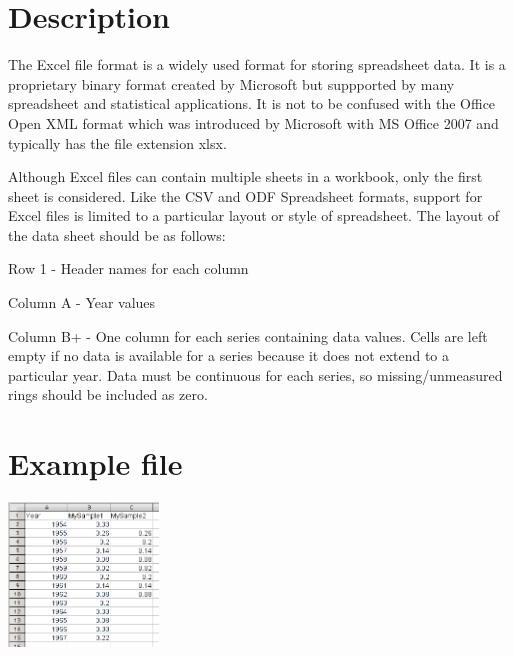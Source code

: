 \section{Description}
The Excel file format is a widely used format for storing spreadsheet data. It is a proprietary binary format created by Microsoft but suppported by many spreadsheet and statistical applications.  It is not to be confused with the Office Open XML format which was introduced by Microsoft with MS Office 2007 and typically has the file extension xlsx.

Although Excel files can contain multiple sheets in a workbook, only the first sheet is considered.  Like the CSV and ODF Spreadsheet formats, support for Excel files is limited to a particular layout or style of spreadsheet. The layout of the data sheet should be as follows:

\begin{itemize*}
 \item Row 1 - Header names for each column
 \item Column A - Year values
 \item Column B+ - One column for each series containing data values. Cells are left empty if no data is available for a series because it does not extend to a particular year. Data must be continuous for each series, so missing/unmeasured rings should be included as zero.
\end{itemize*}

\section{Example file}

\includegraphics[width=4cm]{excel.png}


